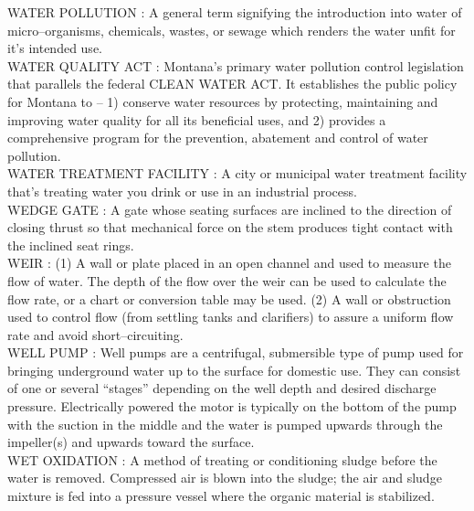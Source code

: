 \vspace{0.15cm}
WATER POLLUTION :  A general term signifying the introduction into water of micro–organisms, chemicals, wastes, or sewage which renders the water unfit for it’s intended use.\\
\vspace{0.15cm}
WATER QUALITY ACT :  Montana's primary water pollution control legislation that parallels the federal CLEAN WATER ACT. It establishes the public policy for Montana to – 1) conserve water resources by protecting, maintaining and improving water quality for all its beneficial uses, and 2) provides a comprehensive program for the prevention, abatement and control of water pollution.\\
\vspace{0.15cm}
WATER TREATMENT FACILITY :   A city or municipal water treatment facility that’s treating water you drink or use in an industrial process.\\
\vspace{0.15cm}
WEDGE GATE :   A gate whose seating surfaces are inclined to the direction of closing thrust so that mechanical force on the stem produces tight contact with the inclined seat rings.\\
\vspace{0.15cm}
WEIR :   (1)      A wall or plate placed in an open channel and used to measure the flow of water. The depth of the flow over the weir can be used to calculate the flow rate, or a chart or conversion table may be used.  (2)     A wall or obstruction used to control flow (from settling tanks and clarifiers) to assure a uniform flow rate and avoid short–circuiting.\\
\vspace{0.15cm}
WELL PUMP :   Well pumps are a centrifugal, submersible type of pump used for bringing underground water up to the surface for domestic use. They can consist of one or several “stages” depending on the well depth and desired discharge pressure. Electrically powered the motor is typically on the bottom of the pump with the suction in the middle and the water is pumped upwards through the impeller(s) and upwards toward the surface.\\
\vspace{0.15cm}
WET OXIDATION :  A method of treating or conditioning sludge before the water is removed. Compressed air is blown into the sludge; the air and sludge mixture is fed into a pressure vessel where the organic material is stabilized.\\
\vspace{0.15cm}
